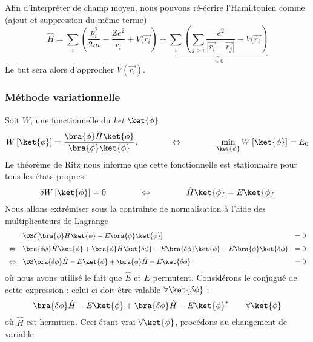 Afin d'interpréter de champ moyen, nous pouvons ré-écrire l'Hamiltonien comme (ajout et suppression du 
même terme)
\begin{equation}
\hat{H} =\sum_i\left( \frac{p_i^2}{2m}-\dfrac{Ze^2}{r_i}+V(\vec{r_i}\right)+\underbrace{\sum_i\left(\sum_{j>i} 
\dfrac{e^2}{|\vec{r_i}-\vec{r_j}|}-V(\vec{r_i}\right)}_{\approx 0}
\end{equation}
Le but sera alors d'approcher $V(\vec{r_i})$.


\subsubsection{Méthode variationnelle}
Soit $W$, une fonctionnelle du \textit{ket} $\ket{\phi}$ 
\begin{equation}
W\left[\ket{\phi}\right] = \dfrac{\bra{\phi}\hat{H}\ket{\phi}}{\bra{\phi}\ket{\phi}},\qquad\qquad\Leftrightarrow
\qquad\qquad \min_{\ket{\phi}} W\left[\ket{\phi}\right] = E_0
\end{equation}
Le théorème de Ritz nous informe que cette fonctionnelle est stationnaire pour tous les états propres:
\begin{equation}
\delta W\left[\ket{\phi}\right] = 0\qquad\qquad\Leftrightarrow\qquad\qquad \hat{H}\ket{\phi}=E\ket{\phi}
\end{equation}
Nous allons extrémiser sous la contrainte de normalisation à l'aide des multiplicateurs de Lagrange
\begin{equation}
\begin{array}{lll}
&\DS\delta[\bra{\phi}\hat{H}\ket{\phi}-E\bra{\phi}\ket{\phi}] &=0\vspace{2mm}\\
\Leftrightarrow&\bra{\delta\phi}\hat{H}\ket{\phi} + \bra{\phi}\hat{H}\ket{\delta \phi} - E\bra{\delta\phi}\ket{\phi}-E
\bra{\phi}\ket{\delta\phi}&=0\vspace{2mm}\\
\Leftrightarrow&\DS \bra{\delta\phi}\hat{H}-E\ket{\phi}+\bra{\phi}\hat{H}-E\ket{\delta\phi}&=0
\end{array}
\end{equation}
où nous avons utilisé le fait que $\hat{E}$ et $E$ permutent. Considérons le conjugué de cette expression : celui-ci
doit être valable $\forall \ket{\delta\phi}$ :
\begin{equation}
\bra{\delta\phi}\hat{H}-E\ket{\phi}+\bra{\delta\phi}\hat{H}-E\ket{\phi}^*\qquad\forall\ket{\phi}
\label{eq:NConj}
\end{equation}
où $\hat{H}$ est hermitien. Ceci étant vrai $\forall\ket{\phi}$, procédons au changement de variable
